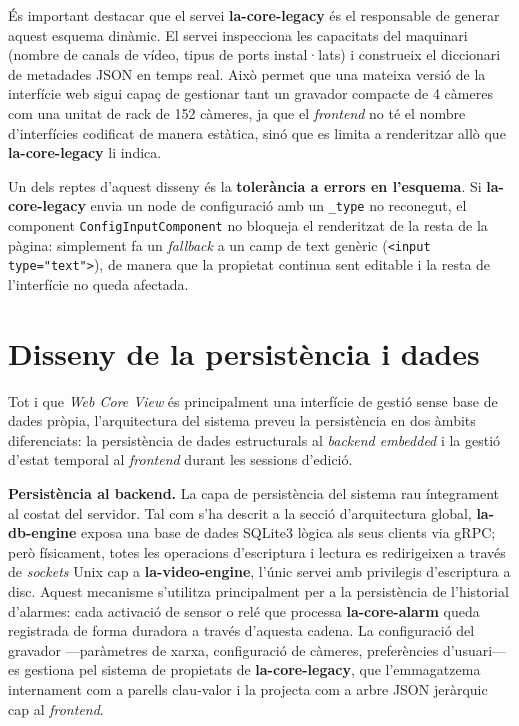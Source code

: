 És important destacar que el servei \textbf{la-core-legacy} és el responsable de generar aquest esquema dinàmic. El servei inspecciona les capacitats del maquinari (nombre de canals de vídeo, tipus de ports instal·lats) i construeix el diccionari de metadades JSON en temps real. Això permet que una mateixa versió de la interfície web sigui capaç de gestionar tant un gravador compacte de 4 càmeres com una unitat de rack de 152 càmeres, ja que el \textit{frontend} no té el nombre d'interfícies codificat de manera estàtica, sinó que es limita a renderitzar allò que \textbf{la-core-legacy} li indica.

Un dels reptes d'aquest disseny és la \textbf{tolerància a errors en l'esquema}. Si \textbf{la-core-legacy} envia un node de configuració amb un \texttt{\_type} no reconegut, el component \texttt{ConfigInputComponent} no bloqueja el renderitzat de la resta de la pàgina: simplement fa un \textit{fallback} a un camp de text genèric (\texttt{<input type="text">}), de manera que la propietat continua sent editable i la resta de l'interfície no queda afectada.

\section{Disseny de la persistència i dades}
Tot i que \textit{Web Core View} és principalment una interfície de gestió sense base de dades pròpia, l'arquitectura del sistema preveu la persistència en dos àmbits diferenciats: la persistència de dades estructurals al \textit{backend embedded} i la gestió d'estat temporal al \textit{frontend} durant les sessions d'edició.

\textbf{Persistència al backend.} La capa de persistència del sistema rau íntegrament al costat del servidor. Tal com s'ha descrit a la secció d'arquitectura global, \textbf{la-db-engine} exposa una base de dades SQLite3 lògica als seus clients via gRPC; però físicament, totes les operacions d'escriptura i lectura es redirigeixen a través de \textit{sockets} Unix cap a \textbf{la-video-engine}, l'únic servei amb privilegis d'escriptura a disc. Aquest mecanisme s'utilitza principalment per a la persistència de l'historial d'alarmes: cada activació de sensor o relé que processa \textbf{la-core-alarm} queda registrada de forma duradora a través d'aquesta cadena. La configuració del gravador —paràmetres de xarxa, configuració de càmeres, preferències d'usuari— es gestiona pel sistema de propietats de \textbf{la-core-legacy}, que l'emmagatzema internament com a parells clau-valor i la projecta com a arbre JSON jeràrquic cap al \textit{frontend}.


